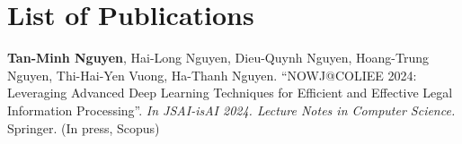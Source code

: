 \chapter*{List of Publications}

\begin{enumerate}[label={[Pub \arabic*]},leftmargin=1.5cm]

\item \textbf{Tan-Minh Nguyen}, Hai-Long Nguyen, Dieu-Quynh Nguyen, Hoang-Trung Nguyen, Thi-Hai-Yen Vuong, Ha-Thanh Nguyen. ``NOWJ@COLIEE 2024: Leveraging Advanced Deep Learning Techniques for Efficient and Effective Legal Information Processing''. \textit{In JSAI-isAI 2024. Lecture Notes in Computer Science.} Springer. (In press, Scopus)


\end{enumerate}